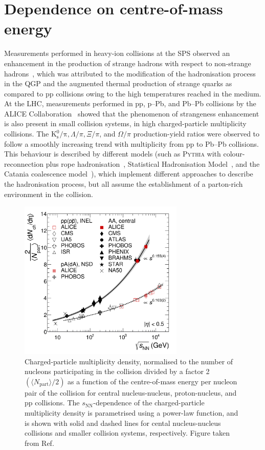 \section{Dependence on centre-of-mass energy}
Measurements performed in heavy-ion collisions at the SPS observed an enhancement in the production of strange hadrons with respect to non-strange hadrons~\cite{WA97:1999uwz,NA57:2010tnk}, which was attributed to the modification of the hadronisation process in the QGP and the augmented thermal production of strange quarks as compared to pp collisions owing to the high temperatures reached in the medium. At the LHC, measurements performed in pp, p--Pb, and Pb--Pb collisions by the ALICE Collaboration~\cite{ALICE:2016fzo,ALICE:2013xmt,ALICE:2015mpp} showed that the phenomenon of strangeness enhancement is also present in small collision systems, in high charged-particle multiplicity collisions. The $\mathrm{K^0_s/\pi}, \Lambda/\pi, \Xi/\pi$, and $\Omega/\pi$ production-yield ratios were observed to follow a smoothly increasing trend with multiplicity from pp to Pb--Pb collisions. This behaviour is described by different models (such as \textsc{Pythia} with colour-reconnection plus rope hadronisation~\cite{Bierlich:2014xba}, Statistical Hadronisation Model~\cite{Andronic:2017pug}, and the Catania coalescence model~\cite{Minissale:2020bif}), which implement different approaches to describe the hadronisation process, but all assume the establishment of a parton-rich environment in the collision.

\begin{figure}[tb]
    \centering
    \includegraphics[width=0.7\textwidth]{Figures/Chapter 7/sqrtsFig-18534.png}
    \caption{Charged-particle multiplicity density, normalised to the number of nucleons participating in the collision divided by a factor 2 $\left(\langle N_\mathrm{part}\rangle/2\right)$ as a function of the centre-of-mass energy per nucleon pair of the collision for central nucleus-nucleus, proton-nucleus, and pp collisions. The $s_\mathrm{NN}$-dependence of the charged-particle multiplicity density is parametrised using a power-law function, and is shown with solid and dashed lines for cental nucleus-nucleus collisions and smaller collision systems, respectively. Figure taken from Ref.~\cite{ALICE:2015juo}}  
    \label{fig:pseudorap_density}
\end{figure}

